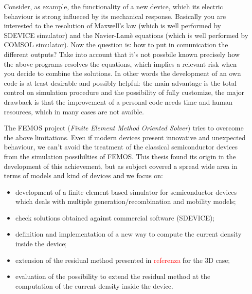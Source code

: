 Consider, as example, the functionality of a new device, which its electric behaviour is strong influeced by its mechanical response. Basically you are interested to the resolution of Maxwell's law  (which is well performed by SDEVICE simulator) and the Navier-Lam\`e equations (which is well performed by COMSOL simulator). Now the question is: how to put in comunication the different outputs?
Take into account that it's not possbile known precisely how the above programs resolves the equations, which implies a relevant risk when you decide to combine the solutions. 
In other words the development of an own code is at least desirable and possibly helpful: the main advantage is the total control on simulation procedure and the possibility of fully customize, the major drawback is that the improvement of a personal code needs time and human resources, which in many cases are not avaible.   

The FEMOS project (\textit{Finite Element Method Oriented Solver}) tries to overcome the above limitations. 
Even if modern devices present innovative and unexpected behaviour, we can't avoid the treatment of the classical semiconductor devices from the simulation possibilties of FEMOS.
This thesis found its origin in the development of this achievement, but as subject covered a spread wide area in terms of models and kind of devices and we focus on:
\begin{itemize}
\item development of a finite element based simulator for semiconductor devices which deals with multiple generation/recombination and mobility models;
\item check solutions obtained against commercial software (SDEVICE);
\item definition and implementation of a new way to compute the current density inside the device;
\item extension of the residual method presented in \textcolor{red}{referenza} for the 3D case;
\item evaluation of the possibility to extend the residual method at the computation of the current density inside the device.
\end{itemize}
